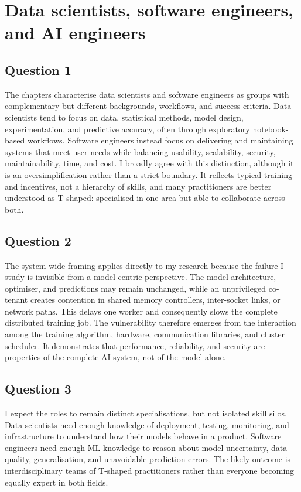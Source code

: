 \documentclass{article}
\begin{document}
\section{Data scientists, software engineers, and AI engineers}

\subsection{Question 1}

The chapters characterise data scientists and software engineers as groups
with complementary but different backgrounds, workflows, and success
criteria. Data scientists tend to focus on data, statistical methods, model
design, experimentation, and predictive accuracy, often through exploratory
notebook-based workflows. Software engineers instead focus on delivering and
maintaining systems that meet user needs while balancing usability,
scalability, security, maintainability, time, and cost. I broadly agree with
this distinction, although it is an oversimplification rather than a strict
boundary. It reflects typical training and incentives, not a hierarchy of
skills, and many practitioners are better understood as T-shaped: specialised
in one area but able to collaborate across both.

\subsection{Question 2}

The system-wide framing applies directly to my research because the failure I
study is invisible from a model-centric perspective. The model architecture,
optimiser, and predictions may remain unchanged, while an unprivileged
co-tenant creates contention in shared memory controllers, inter-socket links,
or network paths. This delays one worker and consequently slows the complete
distributed training job. The vulnerability therefore emerges from the
interaction among the training algorithm, hardware, communication libraries,
and cluster scheduler. It demonstrates that performance, reliability, and
security are properties of the complete AI system, not of the model alone.

\subsection{Question 3}

I expect the roles to remain distinct specialisations, but not isolated skill
silos. Data scientists need enough knowledge of deployment, testing,
monitoring, and infrastructure to understand how their models behave in a
product. Software engineers need enough ML knowledge to reason about model
uncertainty, data quality, generalisation, and unavoidable prediction errors.
The likely outcome is interdisciplinary teams of T-shaped practitioners rather
than everyone becoming equally expert in both fields.
\end{document}

